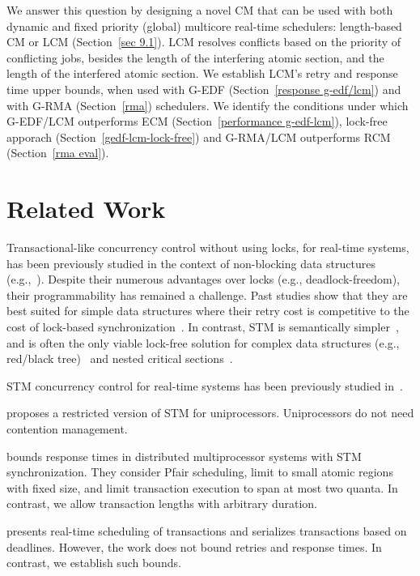 \documentclass[conference]{IEEEtran}
\begin{document}
We answer this question by designing a novel CM that can be used with both dynamic and fixed priority (global) multicore real-time schedulers: length-based CM or LCM (Section~\ref{sec 9.1}). LCM resolves conflicts based on the priority of conflicting jobs, besides the length of the interfering atomic section, and the length of the interfered atomic section.  We establish LCM's retry and response time upper bounds, when used with G-EDF (Section~\ref{response g-edf/lcm}) and with G-RMA (Section~\ref{rma}) schedulers. We identify the conditions under which G-EDF/LCM outperforms ECM (Section~\ref{performance g-edf-lcm}), lock-free apporach (Section~\ref{gedf-lcm-lock-free}) and G-RMA/LCM outperforms RCM (Section~\ref{rma eval}). 

\section{Related Work}
\label{sec:past}

Transactional-like concurrency control without using locks, for real-time systems, has been previously studied in the context of non-blocking data structures (e.g.,~\cite{anderson95realtime}). Despite their numerous advantages over locks 
(e.g., deadlock-freedom), 
their programmability has remained a challenge. 
Past studies show that they are best suited for simple data structures where their retry cost is competitive to the cost of lock-based synchronization~\cite{bc+08}.  In contrast, STM is semantically simpler~\cite{Herlihy:2006:AMP:1146381.1146382}, and is often the only viable lock-free solution for complex data structures (e.g., red/black tree)~\cite{key-1} and nested critical sections~\cite{Saha:2006:MHP:1122971.1123001}.

STM concurrency control for real-time systems has been previously studied in~\cite{manson2006preemptible,fahmy2009bounding,sarni2009real,schoeberl2010rttm,key-1,barrosmanaging,stmconcurrencycontrol:emsoft11}.


\cite{manson2006preemptible} proposes a restricted version of STM for uniprocessors. Uniprocessors do not need contention management.

\cite{fahmy2009bounding} bounds response times in distributed multiprocessor systems with STM synchronization. They consider Pfair scheduling, limit to small atomic regions with fixed size, and limit transaction execution to span at most two quanta. In contrast, we allow transaction lengths 
with  arbitrary duration. 

\cite{sarni2009real} presents real-time scheduling of transactions and serializes transactions based on deadlines. However, the work does not bound retries and response times. In contrast, we establish such bounds.
\end{document}
